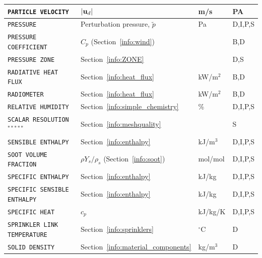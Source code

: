 \documentclass[11pt]{book}
\newcommand{\ct}{\tt\small}
\newcommand{\bu}{{\bf u}}
\newcommand{\tp}{\tilde{p}}
\begin{document}
\begin{longtable}{@{\extracolsep{\fill}}|l|l|l|l|}
{\ct PARTICLE VELOCITY}                         & $|\bu_d|$                                     & m/s            & PA           \\ \hline
{\ct PRESSURE}                                  & Perturbation pressure, $\tp$                  & Pa             & D,I,P,S      \\ \hline
{\ct PRESSURE COEFFICIENT}                      & $C_p$ (Section~\ref{info:wind})               &                & B,D          \\ \hline
{\ct PRESSURE ZONE}                             & Section~\ref{info:ZONE}                       &                & D,S          \\ \hline
{\ct RADIATIVE HEAT FLUX}                       & Section~\ref{info:heat_flux}                  & kW/m$^2$       & B,D          \\ \hline
{\ct RADIOMETER}                                & Section~\ref{info:heat_flux}                  & kW/m$^2$       & B,D          \\ \hline
{\ct RELATIVE HUMIDITY}                         & Section~\ref{info:simple_chemistry}           & \%             & D,I,P,S      \\ \hline
{\ct SCALAR RESOLUTION}$^{*****}$               & Section~\ref{info:meshquality}                &                & S            \\ \hline
{\ct SENSIBLE ENTHALPY}                         & Section~\ref{info:enthalpy}                   & kJ/m$^3$       & D,I,P,S      \\ \hline
{\ct SOOT VOLUME FRACTION}                      & $\rho Y_s/\rho_s$ (Section~\ref{info:soot})   & mol/mol        & D,I,P,S      \\ \hline
{\ct SPECIFIC ENTHALPY}                         & Section~\ref{info:enthalpy}                   & kJ/kg          & D,I,P,S      \\ \hline
{\ct SPECIFIC SENSIBLE ENTHALPY}                & Section~\ref{info:enthalpy}                   & kJ/kg          & D,I,P,S      \\ \hline
{\ct SPECIFIC HEAT}                             & $c_p$                                         & kJ/kg/K        & D,I,P,S      \\ \hline
{\ct SPRINKLER LINK TEMPERATURE}                & Section~\ref{info:sprinklers}                 & $^\circ$C      & D            \\ \hline
{\ct SOLID DENSITY}                             & Section~\ref{info:material_components}        & kg/m$^3$       & D            \\ \hline

\end{longtable}
\end{document}
